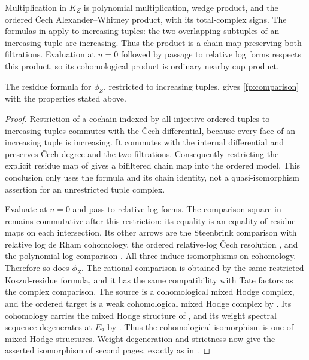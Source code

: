 Multiplication in $K_Z$ is polynomial multiplication, wedge product, and the
ordered \v{C}ech Alexander--Whitney product, with its total-complex signs.
The formulas in \cite[Sections~6.1--6.8]{Fujisawa2014} apply to increasing
tuples: the two overlapping subtuples of an increasing tuple are increasing.
Thus the product is a chain map preserving both filtrations.  Evaluation at
$u=0$ followed by passage to relative log forms respects this product, so its
cohomological product is ordinary nearby cup product.

\begin{lemma}\label{fp:ordered-comparison}
The residue formula for $\phi_Z$, restricted to increasing tuples, gives
\eqref{fp:comparison} with the properties stated above.
\end{lemma}

\begin{proof}
Restriction of a cochain indexed by all injective ordered tuples to increasing
tuples commutes with the \v{C}ech differential, because every face of an
increasing tuple is increasing.  It commutes with the internal differential
and preserves \v{C}ech degree and the two filtrations.  Consequently restricting
the explicit residue map of \cite[Definition~5.24 and Lemma~5.25]{Fujisawa2014}
gives a bifiltered chain map into the ordered model.  This conclusion only
uses the formula and its chain identity, not a quasi-isomorphism assertion
for an unrestricted tuple complex.

Evaluate at $u=0$ and pass to relative log forms.  The comparison square in
\cite[proof of Theorem~5.29]{Fujisawa2014} remains commutative after this
restriction: its equality is an equality of residue maps on each intersection.
Its other arrows are the Steenbrink comparison with relative log de Rham
cohomology, the ordered relative-log \v{C}ech resolution
\cite[Proposition~4.19]{Fujisawa2008}, and the polynomial-log comparison
\cite[Lemma~5.6 and Corollary~5.7]{Fujisawa2008}.  All three induce
isomorphisms on cohomology.  Therefore so does $\phi_Z$.  The rational
comparison is obtained by the same restricted Koszul-residue formula, and
it has the same compatibility with Tate factors as the complex comparison.
The source is a cohomological mixed Hodge complex, and the ordered target
is a weak cohomological mixed Hodge complex by
\cite[Proposition~5.8]{Fujisawa2008}.  Its cohomology carries the mixed
Hodge structure of \cite[Theorem~5.9]{Fujisawa2008}, and its weight spectral
sequence degenerates at $E_2$ by \cite[Lemma~A.6]{Fujisawa2008}.
Thus the cohomological isomorphism is one of mixed Hodge structures.
Weight degeneration and strictness now give
the asserted isomorphism of second pages, exactly as in
\cite[Corollary~5.30]{Fujisawa2014}.
\end{proof}

